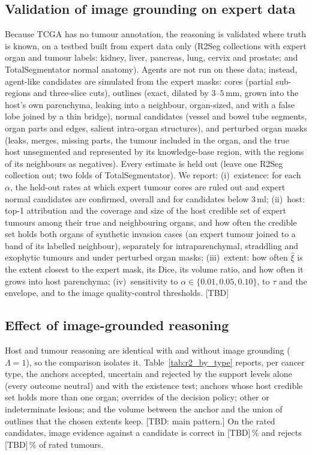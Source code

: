 \documentclass[fleqn,10pt]{olplainarticle}
\begin{document}
\subsection{Validation of image grounding on expert data}
\label{sec:results_expert}
Because TCGA has no tumour annotation, the reasoning is validated where truth is known, on a testbed built from expert
data only (R2Seg collections with expert organ and tumour labels: kidney, liver, pancreas, lung, cervix and prostate; and
TotalSegmentator normal anatomy). Agents are not run on these data; instead, agent-like candidates are simulated from the
expert masks: cores (partial sub-regions and three-slice cuts), outlines (exact, dilated by $3$--$5$\,mm, grown into the
host's own parenchyma, leaking into a neighbour, organ-sized, and with a false lobe joined by a thin bridge), normal
candidates (vessel and bowel tube segments, organ parts and edges, salient intra-organ structures), and perturbed organ
masks (leaks, merges, missing parts, the tumour included in the organ, and the true host unsegmented and represented by
its knowledge-base region, with the regions of its neighbours as negatives). Every estimate is held out (leave one R2Seg
collection out; two folds of TotalSegmentator). We report: (i)~existence: for each $\alpha$, the held-out rates at which expert tumour cores are ruled out and expert normal
candidates are confirmed, overall and for candidates below $3$\,ml;
(ii)~host: top-1 attribution and the coverage and size of the host credible set of expert tumours among their true and
neighbouring organs, and how often the credible set holds both organs of synthetic invasion cases (an expert tumour joined
to a band of its labelled neighbour), separately for intraparenchymal,
straddling and exophytic tumours and under perturbed organ masks; (iii)~extent: how often $\hat\xi$ is the extent closest to
the expert mask, its Dice, its volume ratio, and how often it grows into host parenchyma; (iv)~sensitivity to $\alpha\in\{0.01,0.05,0.10\}$, to $\tau$ and the envelope, and to the image
quality-control thresholds. [TBD]

\subsection{Effect of image-grounded reasoning}
\label{sec:results_r2}
Host and tumour reasoning are identical with and without image grounding ($\Lambda=1$), so the comparison isolates it.
Table~\ref{tab:r2_by_type} reports, per cancer type, the anchors accepted, uncertain and rejected by the support levels alone (every
outcome neutral) and with the existence test; anchors whose host credible set holds more than one organ; overrides of the
decision policy;
other or indeterminate lesions; and the volume between the anchor and the union of outlines that the chosen extents keep. [TBD: main pattern.] On the rated candidates, image evidence against a
candidate is correct in [TBD]\,\% and rejects [TBD]\,\% of rated tumours.
\end{document}
